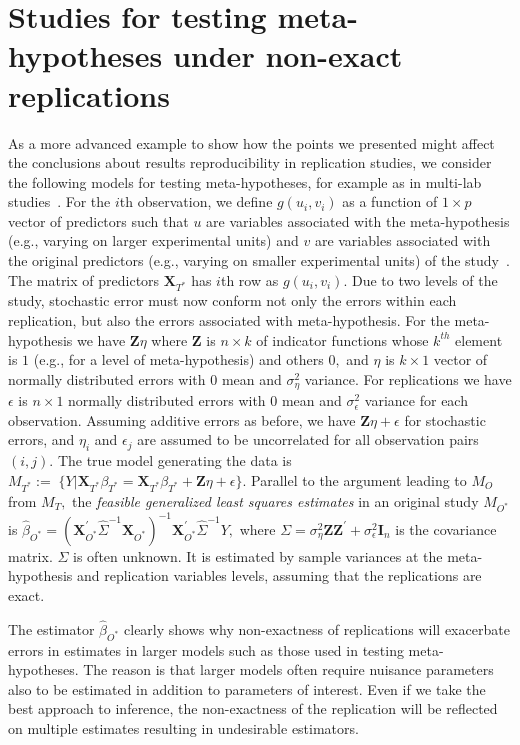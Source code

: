 \documentclass[meta,authordate]{jote-new-article}
\newcommand{\X}{\mathbf{X}}
\newcommand{\Z}{\mathbf{Z}}
\newcounter{result}
\begin{document}
\section{Studies for testing meta-hypotheses under non-exact replications}

As a more advanced example to show how the points we presented might affect the conclusions about results reproducibility in replication studies, we consider the following models for testing meta-hypotheses, for example as in multi-lab studies~\parencite[e.g., author involvement effect tested in Many Labs 4,][]{klein2022many}. For the $i$th observation, we define $g(u_i, v_i)$ as a function of $1 \times p$ vector of predictors such that $u$ are variables associated with the meta-hypothesis (e.g., varying on larger experimental units) and $v$ are variables associated with the original predictors (e.g., varying on smaller experimental units) of the study~\parencite{jones2009split}. The matrix of predictors $\X_{T^*}$ has $i$th row as $g(u_i, v_i).$ Due to two levels of the study, stochastic error must now conform not only the errors within each replication, but also the errors associated with meta-hypothesis. For the meta-hypothesis we have $\Z\eta$ where $\Z$ is $n \times k$ of indicator functions whose $k^{th}$ element is $1$ (e.g., for a level of meta-hypothesis) and others $0,$ and $\eta$ is $k \times 1$ vector of normally distributed errors with 0 mean and $\sigma_{\eta}^2$ variance. For replications we have $\epsilon$ is $n \times 1$ normally distributed errors with 0 mean and $\sigma_{\epsilon}^2$ variance for each observation. Assuming additive errors as before, we have $\Z\eta+\epsilon$ for stochastic errors, and $\eta_i$ and $\epsilon_j$ are assumed to be uncorrelated for all observation pairs $(i,j).$ The true model generating the data is
%
$M_{T^*}:=\; \{Y|\X_{T^*}\beta_{T^*} =\X_{T^*}\beta_{T^*}+\Z\eta+\epsilon\}.
$
%
Parallel to the argument leading to $M_O$ from $M_T,$
the {\em feasible generalized least squares estimates} in an original study $M_{O^*}$ is
%
$
  \hat{\beta}_{O^*} = (\X_{O^*}^{'}\widehat{\Sigma}^{-1}\X_{O^*})^{-1}\X_{O^*}^{'} \widehat{\Sigma}^{-1}Y,
$
%
where
$\Sigma=\sigma_{\eta}^2 \Z \Z^{'}+\sigma_{\epsilon}^2\mathbf{I}_{n}$
is the covariance matrix. $\Sigma$ is often unknown. It is estimated by sample variances at the meta-hypothesis and replication variables levels, assuming that the replications are exact.

The estimator $\hat{\beta}_{O^*}$ clearly shows why non-exactness of replications will exacerbate errors in estimates in larger models such as those used in testing meta-hypotheses. The reason is that larger models often require nuisance parameters also to be estimated in addition to parameters of interest. Even if we take the best approach to inference, the non-exactness of the replication will be reflected on multiple estimates resulting in undesirable estimators.
\end{document}
